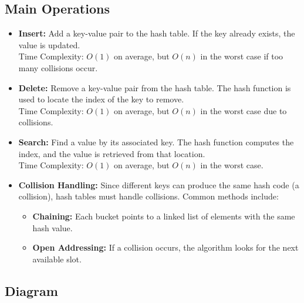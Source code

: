 \documentclass{article}
\begin{document}
\subsection{Main Operations}
\begin{itemize}
    \item \textbf{Insert:} Add a key-value pair to the hash table. If the key already exists, the value is updated.\\
    Time Complexity: $O(1)$ on average, but $O(n)$ in the worst case if too many collisions occur.

    \item \textbf{Delete:} Remove a key-value pair from the hash table. The hash function is used to locate the index of the key to remove.\\
    Time Complexity: $O(1)$ on average, but $O(n)$ in the worst case due to collisions.

    \item \textbf{Search:} Find a value by its associated key. The hash function computes the index, and the value is retrieved from that location.\\
    Time Complexity: $O(1)$ on average, but $O(n)$ in the worst case.

    \item \textbf{Collision Handling:} Since different keys can produce the same hash code (a collision), hash tables must handle collisions. Common methods include:
    \begin{itemize}
        \item \textbf{Chaining:} Each bucket points to a linked list of elements with the same hash value.
        \item \textbf{Open Addressing:} If a collision occurs, the algorithm looks for the next available slot.
    \end{itemize}
\end{itemize}

\subsection{Diagram}
\begin{center}
\end{center}
\end{document}
